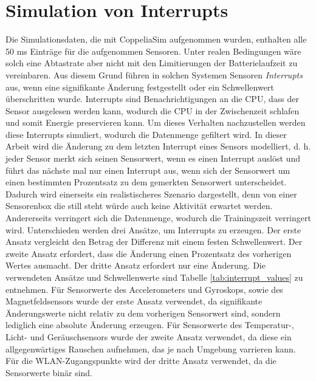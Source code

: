 \section{Simulation von Interrupts}
Die Simulationsdaten, die mit CoppeliaSim aufgenommen wurden, enthalten alle 50 ms Einträge für die aufgenommen Sensoren.
Unter realen Bedingungen wäre solch eine Abtastrate aber nicht mit den Limitierungen der Batterielaufzeit zu vereinbaren.
Aus diesem Grund führen in solchen Systemen Sensoren \textit{Interrupts} aus, wenn eine signifikante Änderung festgestellt oder ein Schwellenwert überschritten wurde.
Interrupts sind Benachrichtigungen an die CPU, dass der Sensor ausgelesen werden kann, wodurch die CPU in der Zwischenzeit schlafen und somit Energie preservieren kann.
\newline
\newline
Um dieses Verhalten nachzustellen werden diese Interrupts simuliert, wodurch die Datenmenge gefiltert wird.
In dieser Arbeit wird die Änderung zu dem letzten Interrupt eines Sensors modelliert,
d. h. jeder Sensor merkt sich seinen Sensorwert, wenn es einen Interrupt auslöst
und führt das nächste mal nur einen Interrupt aus, wenn sich der Sensorwert um einen bestimmten Prozentsatz zu dem gemerkten Sensorwert unterscheidet.
\newpage
Dadurch wird einerseits ein realistischeres Szenario dargestellt,
denn von einer Sensorenbox die still steht würde auch keine Aktivität erwartet werden.
Andererseits verringert sich die Datenmenge, wodurch die Trainingszeit verringert wird.
\newline
\newline
Unterschieden werden drei Ansätze, um Interrupts zu erzeugen.
Der erste Ansatz vergleicht den Betrag der Differenz mit einem festen Schwellenwert.
Der zweite Ansatz erfordert, dass die Änderung einen Prozentsatz des vorherigen Wertes ausmacht.
Der dritte Ansatz erfordert nur eine Änderung.
\newline
\newline
Die verwendeten Ansätze und Schwellenwerte sind Tabelle \ref{tab:interrupt_values} zu entnehmen.
Für Sensorwerte des Accelerometers und Gyroskops, sowie des Magnetfeldsensors wurde der erste Ansatz verwendet,
da signifikante Änderungswerte nicht relativ zu dem vorherigen Sensorwert sind, sondern lediglich eine absolute Änderung erzeugen.
Für Sensorwerte des Temperatur-, Licht- und Geräuschsensors wurde der zweite Ansatz verwendet,
da diese ein allgegenwärtiges Rauschen aufnehmen, das je nach Umgebung varrieren kann.
Für die WLAN-Zugangspunkte wird der dritte Ansatz verwendet, da die Sensorwerte binär sind.
